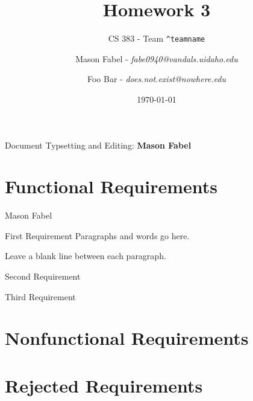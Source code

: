 \documentclass[12pt]{report}
\title{Homework 3}
\subtitle{CS 383 - Team \texttt{\textasciicircum teamname}}
\author{
Mason Fabel - \textit{fabe0940@vandals.uidaho.edu} \\
\and Foo Bar - \textit{does.not.exist@nowhere.edu} \\
}
\date{\today}
\begin{document}
\maketitle

\tableofcontents
Document Typsetting and Editing: \textbf{Mason Fabel}
\clearpage


\chapter{Functional Requirements}

\begin{section}{Mason Fabel}
\begin{subsection}{First Requirement}
Paragraphs and words go here.

Leave a blank line between each paragraph.
\end{subsection}

\begin{subsection}{Second Requirement}

\end{subsection}

\begin{subsection}{Third Requirement}
\end{subsection}
\end{section}

\chapter{Nonfunctional Requirements}

\chapter{Rejected Requirements}
\end{document}
